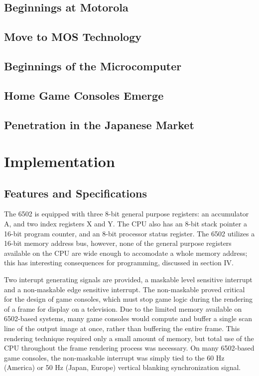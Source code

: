 \documentclass[journal]{IEEEtran}
\begin{document}
\subsection{Beginnings at Motorola}

\subsection{Move to MOS Technology}

\subsection{Beginnings of the Microcomputer}

\subsection{Home Game Consoles Emerge}

\subsection{Penetration in the Japanese Market}

\section{Implementation}

\subsection{Features and Specifications}

The 6502 is equipped with three 8-bit general purpose registers: an accumulator
A, and two index registers X and Y. The CPU also has
an 8-bit stack pointer a 16-bit program counter, and an 8-bit processor status
register. The 6502 utilizes a 16-bit memory address bus, however, none of the
general purpose registers available on the CPU are wide enough to accomodate a
whole memory address; this has interesting consequences for programming,
discussed in section IV.

Two interupt generating signals are provided, a maskable level sensitive
interrupt and a non-maskable edge sensitive interrupt. The non-maskable proved
critical for the design of game consoles, which must stop game logic during the
rendering of a frame for display on a television. Due to the limited memory
available on 6502-based systems, many game consoles would compute and buffer a
single scan line of the output image at once, rather than buffering the entire
frame. This rendering technique required only a small amount of memory, but
total use of the CPU throughout the frame rendering process was necessary. On
many 6502-based game consoles, the non-maskable interrupt was simply tied to the
60 Hz (America) or 50 Hz (Japan, Europe) vertical blanking synchronization
signal.
\end{document}
